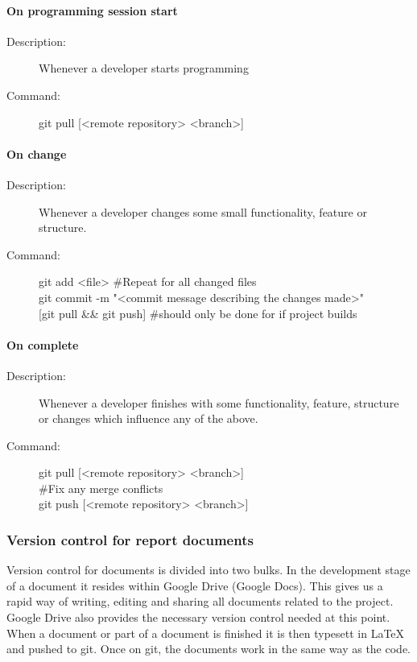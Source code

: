 \paragraph{On programming session start}
\begin{description}
\item[Description:] Whenever a developer starts programming
\item[Command:] git pull [<remote repository> <branch>]
\end{description}

\paragraph{On change}
\begin{description}
\item[Description:] Whenever a developer changes some small functionality, feature or structure.
\item[Command:] git add <file> \#Repeat for all changed files \\
\hspace*{3em} git commit -m "<commit message describing the changes made>"\\
\hspace*{3em} [git pull \&\& git push] \#should only be done for if project builds
\end{description}

\paragraph{On complete}
\begin{description}
\item[Description:]  Whenever a developer finishes with some functionality, feature,  structure or changes 
\hspace*{4em}which influence any of the above.
\item[Command:]  git pull [<remote repository> <branch>] \\ 
\hspace*{3em} \#Fix any merge conflicts \\
\hspace*{3.5em}git push [<remote repository> <branch>]
\end{description}

\subsubsection{Version control for report documents}
Version control for documents is divided into two bulks. In the development stage of a document it resides within Google Drive (Google Docs). This gives us a rapid way of writing, editing and sharing all documents related to the project. Google Drive also provides the necessary version control needed at this point. When a document or part of a document is finished it is then typesett in LaTeX and pushed to \gls{git}. Once on \gls{git}, the documents work in the same way as the code.  


